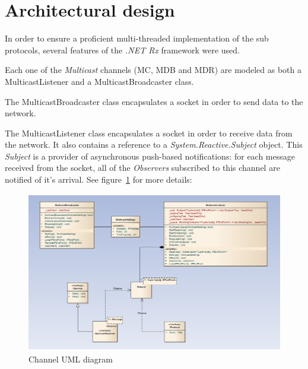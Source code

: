 \documentclass[a4paper]{article}
\begin{document}

\newpage

\tableofcontents

\newpage

\section{Architectural design}

In order to ensure a proficient multi-threaded implementation of the sub protocols, several features of the \textit{.NET Rx} framework were used.

Each one of the \textit{Multicast} channels (MC, MDB and MDR) are modeled as both a MulticastListener and a MulticastBroadcaster class.

The MulticastBroadcaster class encapsulates a socket in order to send data to the network.

The MulticastListener class encapsulates a socket in order to receive data from the network. It also contains a reference to a \textit{System.Reactive.Subject} object. This \textit{Subject} is a provider of asynchronous push-based notifications: for each message received from the socket, all of the \textit{Observers} subscribed to this channel are notified of it's arrival. See figure~\ref{fig:sockets} for more details:

\begin{figure}[h!]
\begin{center}
\includegraphics[height=7cm, width=12cm]{figures/socketsUML.PNG}
\caption{Channel UML diagram}
\label{fig:sockets}
\end{center}
\end{figure}
\end{document}
